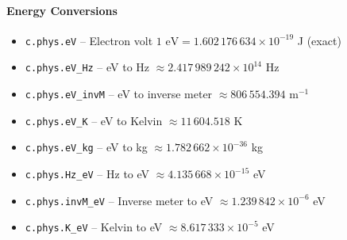 \paragraph{Energy Conversions}
\begin{itemize}
\item \texttt{c.phys.eV} -- Electron volt $1\text{ eV} = 1.602\,176\,634 \times 10^{-19}$ J (exact)
\item \texttt{c.phys.eV\_Hz} -- eV to Hz $\approx 2.417\,989\,242 \times 10^{14}$ Hz
\item \texttt{c.phys.eV\_invM} -- eV to inverse meter $\approx 806\,554.394$ m$^{-1}$
\item \texttt{c.phys.eV\_K} -- eV to Kelvin $\approx 11\,604.518$ K
\item \texttt{c.phys.eV\_kg} -- eV to kg $\approx 1.782\,662 \times 10^{-36}$ kg
\item \texttt{c.phys.Hz\_eV} -- Hz to eV $\approx 4.135\,668 \times 10^{-15}$ eV
\item \texttt{c.phys.invM\_eV} -- Inverse meter to eV $\approx 1.239\,842 \times 10^{-6}$ eV
\item \texttt{c.phys.K\_eV} -- Kelvin to eV $\approx 8.617\,333 \times 10^{-5}$ eV
\end{itemize}

